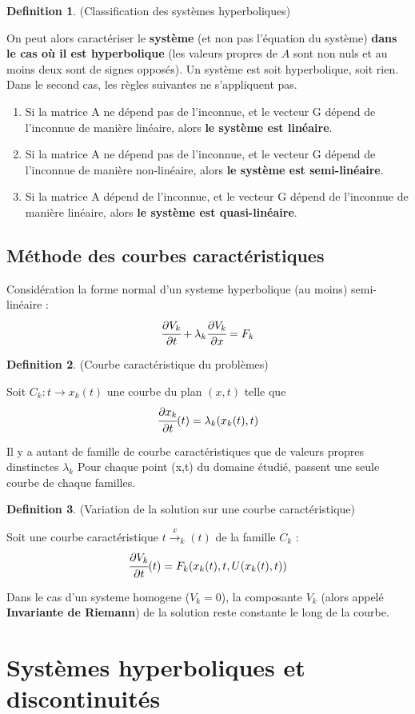 \documentclass[french]{article}
\theoremstyle{definition}
\newtheorem{definition}{Definition}[section]
\begin{document}
\begin{definition}(Classification des systèmes hyperboliques)\par
	On peut alors caractériser le \textbf{système} (et non pas l'équation du système) \textbf{dans le cas où il est hyperbolique} (les valeurs propres de $A$ sont non nuls et au moins deux sont de signes opposés). Un système est soit hyperbolique, soit rien. Dans le second cas, les règles suivantes ne s'appliquent pas.
	\begin{enumerate}[label=\textbullet,topsep=5pt,parsep=0pt,itemsep=0pt,before=\vspace{-0.2\baselineskip},after=\vspace{0.1\baselineskip}] 
		\item Si la matrice A ne dépend pas de l'inconnue, et le vecteur G dépend de l'inconnue de manière linéaire, alors \textbf{le système est linéaire}.
		\item Si la matrice A ne dépend pas de l'inconnue, et le vecteur G dépend de l'inconnue de manière non-linéaire, alors \textbf{le système est semi-linéaire}.
		\item Si la matrice A dépend de l'inconnue, et le vecteur G dépend de l'inconnue de manière linéaire, alors \textbf{le système est quasi-linéaire}.
	\end{enumerate}
\end{definition}

\subsection{Méthode des courbes caractéristiques}
Considération la forme normal d'un systeme hyperbolique (au moins) semi-linéaire :
$$\cfrac{\partial V_k}{\partial t} + \lambda_k \cfrac{\partial V_k}{\partial x} = F_k$$

\begin{definition} (Courbe caractéristique du problèmes)\par
    Soit $C_k : t \xrightarrow{} x_k(t)$ une courbe du plan $(x,t)$ telle que
    $$ \cfrac{\partial x_k}{\partial t}(t) = \lambda_k(x_k(t),t) $$
\end{definition}
Il y a autant de famille de courbe caractéristiques que de valeurs propres dinstinctes $\lambda_k$
Pour chaque point (x,t) du domaine étudié, passent une seule courbe de chaque familles.

\begin{definition} (Variation de la solution sur une courbe caractéristique) \par
    Soit une courbe caractéristique $t \xrightarrow x_k(t)$ de la famille $C_k$ :
    $$ \cfrac{\partial V_k}{\partial t}(t) = F_k(x_k(t),t,U(x_k(t),t)) $$
    
    Dans le cas d'un systeme homogene ($V_k = 0$), la composante $V_k$ (alors appelé \textbf{Invariante de Riemann}) de la solution reste constante le long de la courbe. 
\end{definition}

\section{Systèmes hyperboliques et discontinuités}
\end{document}
